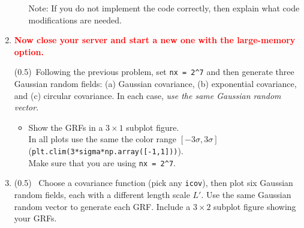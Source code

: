 \documentclass[11pt,titlepage,fleqn]{article}
\begin{document}
\begin{enumerate}
\begin{itemize}
Note: If you do not implement the code correctly, then explain what code modifications are needed.
\end{itemize}

\item \textcolor{red}{\bf Now close your server and start a new one with the large-memory option.}

(0.5)\ptag\ Following the previous problem, set \verb+nx = 2^7+ and then generate three Gaussian random fields: (a) Gaussian covariance, (b) exponential covariance, and (c) circular covariance. In each case, {\em use the same Gaussian random vector}.
%
\begin{itemize}
\item Show the GRFs in a $3 \times 1$ subplot figure. \\
In all plots use the same the color range $[-3\sigma, 3\sigma]$ (\verb+plt.clim(3*sigma*np.array([-1,1]))+).  \\
Make sure that you are using \verb+nx = 2^7+.
\end{itemize}

\item (0.5) \ptag\ Choose a covariance function (pick any \verb+icov+), then plot six Gaussian random fields, each with a different length scale $L'$. Use the same Gaussian random vector to generate each GRF. Include a $3 \times 2$ subplot figure showing your GRFs.

\end{enumerate}







\end{document}
